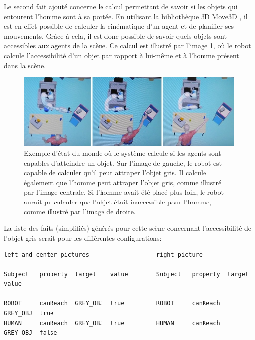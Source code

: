 \documentclass[a4paper,11pt,twoside]{StyleThese}
\begin{document}
Le second fait ajouté concerne le calcul permettant de savoir si les objets qui entourent l'homme sont à sa portée. En utilisant la bibliothèque 3D Move3D  \cite{Simeon2001}, il est en effet possible de calculer la cinématique d'un agent et de planifier ses mouvements. Grâce à cela, il est donc possible de savoir quels objets sont accessibles aux agents de la scène. Ce calcul est illustré par l'image \ref{fig:reach}, où le robot calcule l'accessibilité d'un objet par rapport à lui-même et à l'homme présent dans la scène.



\begin{figure}[ht!]
 \centering
  \includegraphics[width=0.99\linewidth]{./img/reach.jpg} 
  \caption {Exemple d'état du monde où le système calcule si les agents sont capables d'atteindre un objet. Sur l'image de gauche, le robot est capable de calculer qu'il peut attraper l'objet gris. Il calcule également que l'homme peut attraper l'objet gris, comme illustré par l'image centrale. Si l'homme avait été placé plus loin, le robot aurait pu calculer que l'objet était inaccessible pour l'homme, comme illustré par l'image de droite.}
  \label{fig:reach}
\end{figure}


La liste des faits (simplifiés) générés pour cette scène concernant l'accessibilité de l'objet gris serait pour les différentes configurations:

\begin{scriptsize}
\begin{verbatim}
left and center pictures                   right picture

Subject   property  target    value        Subject   property  target    value

ROBOT     canReach  GREY_OBJ  true         ROBOT     canReach  GREY_OBJ  true
HUMAN     canReach  GREY_OBJ  true         HUMAN     canReach  GREY_OBJ  false
\end{verbatim}
\end{scriptsize}
\end{document}
